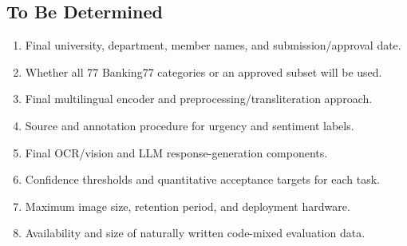 \documentclass[10pt,letterpaper]{article}
\newenvironment{templatebody}{\par\justifying\setlength{\emergencystretch}{3em}}{\par}
\begin{document}
\begin{templatebody}
\subsection*{To Be Determined}
\begin{enumerate}
    \item Final university, department, member names, and submission/approval date.
    \item Whether all 77 Banking77 categories or an approved subset will be used.
    \item Final multilingual encoder and preprocessing/transliteration approach.
    \item Source and annotation procedure for urgency and sentiment labels.
    \item Final OCR/vision and LLM response-generation components.
    \item Confidence thresholds and quantitative acceptance targets for each task.
    \item Maximum image size, retention period, and deployment hardware.
    \item Availability and size of naturally written code-mixed evaluation data.
\end{enumerate}


\end{templatebody}
\end{document}
